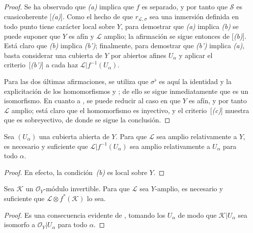 \documentclass[oneside,10pt]{amsart}
\newcommand{\oldpage}[2][]{\marginnote{\normalfont\footnotesize\textbf{#1}~|~#2}\ignorespaces}
\let\EGAOriginalLabel\label
\renewcommand{\label}[1]{\phantomsection\EGAOriginalLabel{#1}}
\begin{document}
\begin{proof}
Se ha observado que \emph{(a)} implica que $f$ es separado, y por tanto que $\mathcal{S}$ es cuasicoherente [\emph{(a)}].
Como el hecho de que $r_{\mathcal{L},\sigma}$ sea una inmersión definida en todo punto tiene carácter local sobre $Y$, para demostrar que \emph{(a)} implica \emph{(b)} se puede suponer que $Y$ es afín y $\mathcal{L}$ amplio;
\oldpage[II]{90}
la afirmación se sigue entonces de [\emph{(b)}].
Está claro que \emph{(b)} implica \emph{(b')};
finalmente, para demostrar que \emph{(b')} implica \emph{(a)}, basta considerar una cubierta de $Y$ por abiertos afines $U_\alpha$ y aplicar el criterio~[\emph{(b')}] a cada haz $\mathcal{L}|f^{-1}(U_\alpha)$.

Para las dos últimas afirmaciones, se utiliza que $\sigma^\flat$ es aquí la identidad y la explicitación de los homomorfismos  y ;
de ello se sigue inmediatamente que  es un isomorfismo.
En cuanto a , se puede reducir al caso en que $Y$ es afín, y por tanto $\mathcal{L}$ amplio;
está claro que el homomorfismo  es inyectivo, y el criterio~[\emph{(c)}] muestra que es sobreyectivo, de donde se sigue la conclusión.
\end{proof}

\begin{corollary}[4.6.4]
\label{II.4.6.4-fr}
Sea $(U_\alpha)$ una cubierta abierta de $Y$.
Para que $\mathcal{L}$ sea amplio relativamente a $Y$, es necesario y suficiente que $\mathcal{L}|f^{-1}(U_\alpha)$ sea amplio relativamente a $U_\alpha$ para todo $\alpha$.
\end{corollary}

\begin{proof}
En efecto, la condición~\emph{(b)} es local sobre $Y$.
\end{proof}

\begin{corollary}[4.6.5]
\label{II.4.6.5-fr}
Sea $\mathcal{K}$ un $\mathcal{O}_Y$-módulo invertible.
Para que $\mathcal{L}$ sea $Y$-amplio, es necesario y suficiente que $\mathcal{L}\otimes f^*(\mathcal{K})$ lo sea.
\end{corollary}

\begin{proof}
Es una consecuencia evidente de , tomando los $U_\alpha$ de modo que $\mathcal{K}|U_\alpha$ sea isomorfo a $\mathcal{O}_Y|U_\alpha$ para todo $\alpha$.
\end{proof}
\end{document}
